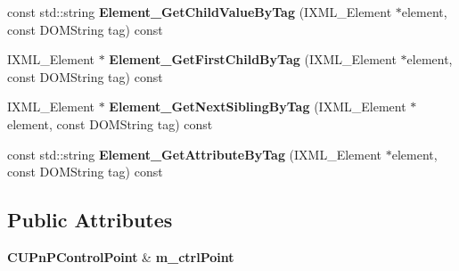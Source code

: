 \begin{DoxyCompactItemize}
\item 
const std::string {\bfseries Element\_\-GetChildValueByTag} (IXML\_\-Element $\ast$element, const DOMString tag) const \label{classCUPnPLib_a9cf8ea8637e12a6cb489139a13a2f782}

\item 
IXML\_\-Element $\ast$ {\bfseries Element\_\-GetFirstChildByTag} (IXML\_\-Element $\ast$element, const DOMString tag) const \label{classCUPnPLib_ad0f0a6e1284765d1d66c969a2142e675}

\item 
IXML\_\-Element $\ast$ {\bfseries Element\_\-GetNextSiblingByTag} (IXML\_\-Element $\ast$element, const DOMString tag) const \label{classCUPnPLib_a81c9aacd7da3773b8dcae0ca1e4dce93}

\item 
const std::string {\bfseries Element\_\-GetAttributeByTag} (IXML\_\-Element $\ast$element, const DOMString tag) const \label{classCUPnPLib_add3a8febd59fac26a582fe4292f08c21}

\end{DoxyCompactItemize}
\subsection*{Public Attributes}
\begin{DoxyCompactItemize}
\item 
{\bf CUPnPControlPoint} \& {\bfseries m\_\-ctrlPoint}\label{classCUPnPLib_aa95d67f1b986ed4dd09ab10e39a9d054}

\end{DoxyCompactItemize}
